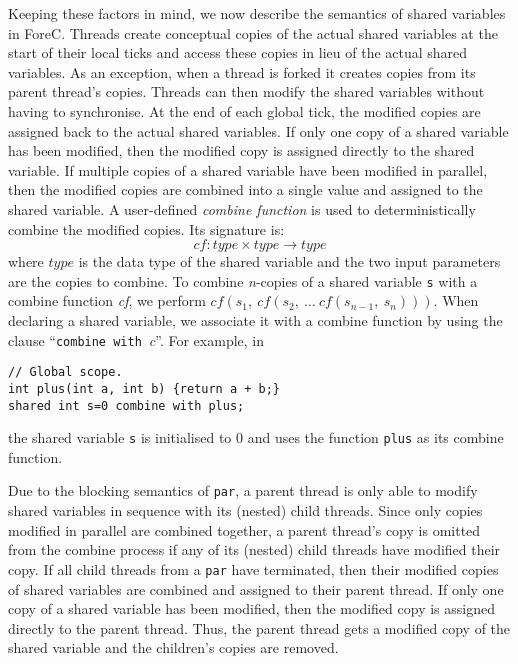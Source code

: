 Keeping these factors in mind, we now describe the semantics of 
shared variables in ForeC. Threads create conceptual copies of the 
actual shared variables at the start of their local ticks and access 
these copies in lieu of the actual shared variables. As an exception,
when a thread is forked it creates copies from its parent thread's 
copies. Threads can then modify the shared variables without having 
to synchronise. At the end of each global tick, the modified copies 
are assigned back to the actual shared variables. If only one copy 
of a shared variable has been modified, then the modified copy is 
assigned directly to the shared variable. If multiple copies of a 
shared variable have been modified in parallel, then the modified 
copies are combined into a single value and assigned to the shared 
variable. A user-defined \emph{combine function} is used to 
deterministically combine the modified copies. Its signature is:
\begin{equation*}
	cf: type \times type \to type
\end{equation*}
where $type$ is the data type of the shared variable and the two 
input parameters are the copies to combine. To combine \emph{n}-copies
of a shared variable \verb$s$ with a combine function \emph{cf}, 
we perform $cf(s_1,~cf(s_2,~\dots~cf(s_{n-1},~s_n)))$. When declaring 
a shared variable, we associate it with a combine function by using 
the clause ``\verb$combine with$~\emph{c}''. For example, in 
\begin{lstlisting}[style=snippet]
// Global scope.
int plus(int a, int b) {return a + b;}
shared int s=0 combine with plus;
\end{lstlisting}
the shared variable \verb$s$ is initialised to $0$ and uses 
the function \verb$plus$ as its combine function.

Due to the blocking semantics of \verb$par$, a parent thread 
is only able to modify shared variables in sequence with its 
(nested) child threads. Since only copies modified in parallel 
are combined together, a parent thread's copy is omitted from 
the combine process if any of its (nested) child threads have 
modified their copy. If all child threads from a \verb$par$ have 
terminated, then their modified copies of shared variables are
combined and assigned to their parent thread. If only one copy of a 
shared variable has been modified, then the modified copy is assigned 
directly to the parent thread. Thus, the parent thread gets 
a modified copy of the shared variable and the children's copies 
are removed.

